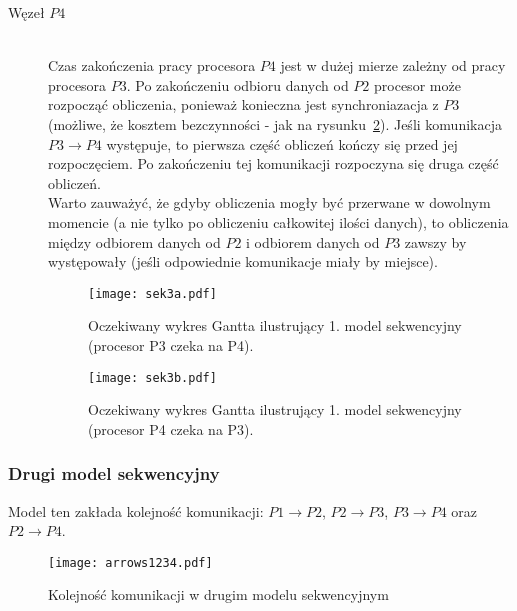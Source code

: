 \begin{description}
\item[Węzeł $P4$] \hfill \\

Czas zakończenia pracy procesora $P4$ jest w dużej mierze zależny od pracy procesora $P3$. Po zakończeniu odbioru danych od $P2$ procesor może rozpocząć obliczenia,
ponieważ konieczna jest synchroniazacja z $P3$ (możliwe, że kosztem bezczynności - jak na rysunku~\ref{fig:seq1b}).
Jeśli komunikacja $P3 \to P4$ występuje, to pierwsza część obliczeń kończy się przed jej rozpoczęciem. Po zakończeniu tej komunikacji rozpoczyna się druga część obliczeń. \\

Warto zauważyć, że gdyby obliczenia mogły być przerwane w dowolnym momencie (a nie tylko po obliczeniu całkowitej ilości danych),
to obliczenia między odbiorem danych od $P2$ i odbiorem danych od $P3$ zawszy by występowały (jeśli odpowiednie komunikacje miały by miejsce).

\begin{figure}[H]
\centering
\texttt{[image: sek3a.pdf]}
\caption{Oczekiwany wykres Gantta ilustrujący 1. model sekwencyjny (procesor P3 czeka na P4).}
\label{fig:seq1a}
\end{figure}

\begin{figure}[H]
\centering
\texttt{[image: sek3b.pdf]}
\caption{Oczekiwany wykres Gantta ilustrujący 1. model sekwencyjny (procesor P4 czeka na P3).}
\label{fig:seq1b}
\end{figure}

\end{description}

\subsubsection{Drugi model sekwencyjny}

Model ten zakłada kolejność komunikacji: $P1 \to P2$, $P2 \to P3$, $P3 \to P4$ oraz $P2 \to P4$. \\

\begin{figure}[!ht]
\centering
\texttt{[image: arrows1234.pdf]}
\caption{Kolejność komunikacji w drugim modelu sekwencyjnym}
\label{fig:seq2}
\end{figure}

